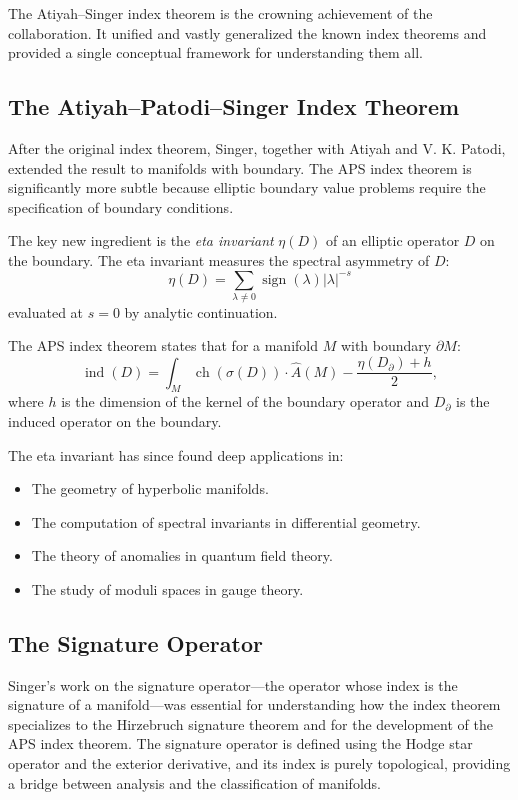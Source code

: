 The Atiyah--Singer index theorem is the crowning achievement of the collaboration. It unified and vastly generalized the known index theorems and provided a single conceptual framework for understanding them all.

\subsection{The Atiyah--Patodi--Singer Index Theorem}

After the original index theorem, Singer, together with Atiyah and V. K. Patodi, extended the result to manifolds with boundary. The APS index theorem is significantly more subtle because elliptic boundary value problems require the specification of boundary conditions.

The key new ingredient is the \emph{eta invariant} $\eta(D)$ of an elliptic operator $D$ on the boundary. The eta invariant measures the spectral asymmetry of $D$:
\[
\eta(D) = \sum_{\lambda \neq 0} \operatorname{sign}(\lambda) |\lambda|^{-s}
\]
evaluated at $s = 0$ by analytic continuation.

The APS index theorem states that for a manifold $M$ with boundary $\partial M$:
\[
\operatorname{ind}(D) = \int_M \operatorname{ch}(\sigma(D)) \cdot \widehat A(M) - \frac{\eta(D_{\partial}) + h}{2},
\]
where $h$ is the dimension of the kernel of the boundary operator and $D_{\partial}$ is the induced operator on the boundary.

The eta invariant has since found deep applications in:
\begin{itemize}
\item The geometry of hyperbolic manifolds.
\item The computation of spectral invariants in differential geometry.
\item The theory of anomalies in quantum field theory.
\item The study of moduli spaces in gauge theory.
\end{itemize}

\subsection{The Signature Operator}

Singer's work on the signature operator---the operator whose index is the signature of a manifold---was essential for understanding how the index theorem specializes to the Hirzebruch signature theorem and for the development of the APS index theorem. The signature operator is defined using the Hodge star operator and the exterior derivative, and its index is purely topological, providing a bridge between analysis and the classification of manifolds.

